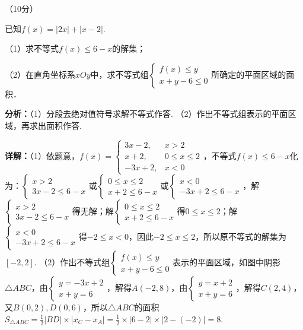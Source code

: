 \begin{question}[points=10]
[选修4-5]（10分）

已知$f(x)=|2x|+|x-2|$.

（1）求不等式$f(x)\le6-x$的解集；

（2）在直角坐标系$xOy$中，求不等式组$\begin{cases}f(x)\le y\\x+y-6\le0\end{cases}$所确定的平面区域的面积．
\begin{solution}

\textbf{分析：}（1）分段去绝对值符号求解不等式作答.
（2）作出不等式组表示的平面区域，再求出面积作答.

\textbf{详解：}（1）依题意，$f(x)=\begin{cases}3x-2, & x>2\\x+2, & 0\le x\le2\\-3x+2, & x<0\end{cases}$，不等式$f(x)\le6-x$化为：$\begin{cases}x>2\\3x-2\le6-x\end{cases}$或$\begin{cases}0\le x\le2\\x+2\le6-x\end{cases}$或$\begin{cases}x<0\\-3x+2\le6-x\end{cases}$，解$\begin{cases}x>2\\3x-2\le6-x\end{cases}$得无解；解$\begin{cases}0\le x\le2\\x+2\le6-x\end{cases}$得$0\le x\le2$；解$\begin{cases}x<0\\-3x+2\le6-x\end{cases}$得$-2\le x<0$，因此$-2\le x\le2$，所以原不等式的解集为$[-2,2]$.
（2）作出不等式组$\begin{cases}f(x)\le y\\x+y-6\le0\end{cases}$表示的平面区域，如图中阴影$\triangle ABC$，由$\begin{cases}y=-3x+2\\x+y=6\end{cases}$，解得$A(-2,8)$，由$\begin{cases}y=x+2\\x+y=6\end{cases}$，解得$C(2,4)$，又$B(0,2), D(0,6)$，所以$\triangle ABC$的面积$S_{\triangle ABC}=\frac{1}{2}|BD|\times|x_C-x_A|=\frac{1}{2}\times|6-2|\times|2-(-2)|=8$.
\end{solution}
\end{question}

